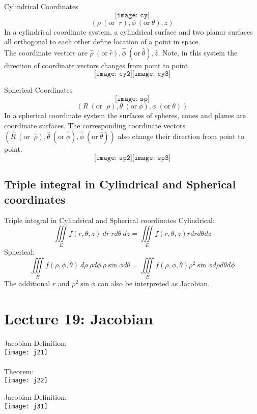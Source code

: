 \documentclass[10pt]{beamer}
\begin{document}
\begin{frame}[allowframebreaks]{Cylindrical Coordinates}
	$$\texttt{[image: cy]}$$
	$$(\rho~(\text{or }~r),\phi~(\text{or}~\theta),z)$$
In a cylindrical coordinate
system, a cylindrical
surface and two planar
surfaces all orthogonal to
each other define location
of a point in space.
\\The
coordinate vectors are $\hat{\rho}~(\text{or}~\hat{r}), \hat{\phi}~(\text{or}~\hat{\theta}), \hat{z}$. Note, in this system the
direction of coordinate
vectors changes from point
to point.
\newpage
$$\texttt{[image: cy2]}\texttt{[image: cy3]}$$
\end{frame}


\begin{frame}[allowframebreaks]{Spherical Coordinates}
	$$\texttt{[image: sp]}$$
	$$(R~(\text{or }~\rho),\theta~(\text{or}~\phi),\phi~(\text{or} ~ \theta))$$
	In a spherical coordinate
	system the surfaces of
	spheres, cones and planes are
	coordinate surfaces. The
	corresponding coordinate
	vectors $(\hat{R}~(\text{or }~\hat{\rho}),\hat{\theta}~(\text{or}~\hat{\phi}),\hat{\phi}~(\text{or} ~ \hat{\theta}))$ also change their
	direction from point to point.
	\newpage
	$$\texttt{[image: sp2]}\texttt{[image: sp3]}$$
	
\end{frame}

\subsection{Triple integral in Cylindrical and Spherical coordinates}
\begin{frame}[allowframebreaks]{Triple integral in Cylindrical and Spherical coordinates}
Cylindrical:
$$\iiint\limits_E f(r,\theta,z) ~dr~rd\theta ~dz = \iiint\limits_E f(r,\theta,z) \underline{r}drd\theta dz$$
Spherical:
$$\iiint\limits_E f(\rho,\phi,\theta)~d\rho ~ \rho d\phi ~ \rho\sin\phi d\theta = \iiint\limits_E f(\rho,\phi,\theta)\underline{\rho^2\sin\phi} d\rho d\theta d\phi$$
The additional $r$ and $\rho^2\sin\phi$ can also be interpreted as {\color{red}Jacobian}.
\end{frame}





\section{Lecture 19: Jacobian}


\begin{frame}[allowframebreaks]{Jacobian}
Definition:\\
\texttt{[image: j21]}
\\~\\Theorem:\\
\texttt{[image: j22]}
\end{frame}


\begin{frame}[allowframebreaks]{Jacobian}
	Definition:\\
	\texttt{[image: j31]}
\end{frame}
\end{document}
